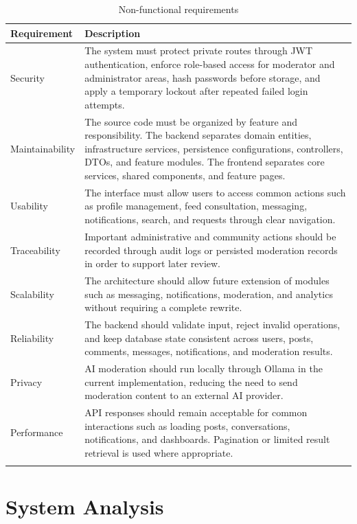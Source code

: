 \begin{longtable}{|m{3.2cm}|m{11.5cm}|}
\hline
\textbf{Requirement} & \textbf{Description} \\
\hline
Security & The system must protect private routes through JWT authentication, enforce role-based access for moderator and administrator areas, hash passwords before storage, and apply a temporary lockout after repeated failed login attempts. \\
\hline
Maintainability & The source code must be organized by feature and responsibility. The backend separates domain entities, infrastructure services, persistence configurations, controllers, DTOs, and feature modules. The frontend separates core services, shared components, and feature pages. \\
\hline
Usability & The interface must allow users to access common actions such as profile management, feed consultation, messaging, notifications, search, and requests through clear navigation. \\
\hline
Traceability & Important administrative and community actions should be recorded through audit logs or persisted moderation records in order to support later review. \\
\hline
Scalability & The architecture should allow future extension of modules such as messaging, notifications, moderation, and analytics without requiring a complete rewrite. \\
\hline
Reliability & The backend should validate input, reject invalid operations, and keep database state consistent across users, posts, comments, messages, notifications, and moderation results. \\
\hline
Privacy & AI moderation should run locally through Ollama in the current implementation, reducing the need to send moderation content to an external AI provider. \\
\hline
Performance & API responses should remain acceptable for common interactions such as loading posts, conversations, notifications, and dashboards. Pagination or limited result retrieval is used where appropriate. \\
\hline
\caption{Non-functional requirements}\\
\end{longtable}

\section{System Analysis}


